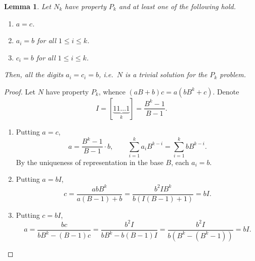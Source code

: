 \documentclass[sn-mathphys]{sn-jnl}%
\theoremstyle{thmstyleone}%
\newtheorem{lemma}[theorem]{Lemma}
\theoremstyle{thmstyletwo}%
\theoremstyle{thmstylethree}%
\begin{document}
\begin{appendices}
\begin{lemma} \label{lemma:trivial_2}
    Let $N_k$ have property $P_k$ and at least one of the following hold.
    \begin{enumerate}
        \item $a = c$.
        \item $a_i = b$ for all $1 \leq i \leq k$.
        \item $c_i = b$ for all $1 \leq i \leq k$.
    \end{enumerate}
    Then, all the digits $a_i = c_i = b$, i.e.\ $N$ is a trivial solution for 
    the $P_k$ problem.
\end{lemma}
\begin{proof}
    Let $N$ have property $P_k$, whence $(aB + b)c = a(bB^k + c)$.
    Denote \[
        I = [\underbrace{1 1 \dots 1}_k] = \frac{B^k - 1}{B - 1}.
    \]
    \begin{enumerate}
        \item Putting $a = c$, \[
            a = \frac{B^k - 1}{B - 1}\cdot b, \qquad
            \sum_{i = 1}^k a_iB^{k - i} = \sum_{i = 1}^k bB^{k - i}.
        \] By the uniqueness of representation in the base $B$, each $a_i = b$.

        \item Putting $a = bI$, \[
            c = \frac{abB^k}{a(B - 1) + b} = \frac{b^2I B^k}{b(I(B - 1) +
            1)} = bI.
        \]

        \item Putting $c = bI$, \[
            a = \frac{bc}{bB^k - (B - 1)c} = \frac{b^2I}{bB^k - b(B - 1)I} = 
            \frac{b^2I}{b(B^k - (B^k - 1))} = bI. %
        \]
    \end{enumerate}
\end{proof}




\end{appendices}
\end{document}
